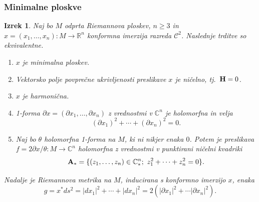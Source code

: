 \documentclass[9pt, table]{beamer}
\newtheorem{izrek}{Izrek}
\newcommand{\R}{\mathbb R}
\newcommand{\C}{\mathbb C}
\begin{document}
\begin{frame}
\frametitle{Minimalne ploskve}

\begin{izrek}
Naj bo $M$ odprta Riemannova ploskev, $n \geq 3$ in $x = (x_1, \dots , x_n) \colon M \to \R^{n}$ konformna imerzija razreda $\mathcal{C}^2$. Naslednje trditve so ekvivalentne.
\begin{enumerate}
	\item $x$ je minimalna ploskev.
	\item Vektorsko polje povprečne ukrivljenosti preslikave $x$ je ničelno, tj.~$\textbf{\textup{H}} = 0$.
	\item $x$ je harmonična.
	\item 1-forma $ \partial{x} = (\partial{x_1}, \dots , \partial{x_n})$ z vrednostmi v $\C^{n}$ je holomorfna in velja
			\begin{equation} \label{eq:partialx^2 = 0}
			(\partial{x_1})^2 + \cdots + (\partial{x_n})^2 = 0.
			\end{equation}
	\item Naj bo $\theta$ holomorfna 1-forma na $M$, ki ni nikjer enaka $0$. Potem je preslikava $f = 2\partial{x} / \theta \colon M \to \C^{n}$ holomorfna z 				vrednostmi v punktirani ničelni kvadriki
			\begin{equation}	
			\textbf{\textup{A}}_{*} = \{ (z_1, \dots , z_n) \in \C^{n}_{*} ; \ z_{1}^{2} + \cdots + z_{n}^{2} = 0 \}.
			\end{equation}	
\end{enumerate}
Nadalje je Riemannova metrika na $M$, inducirana s konformno imerzijo $x$, enaka
	\begin{equation} \label{eq:|dx|^2=2|partialx|^2}
	g = x^{*} ds^2 = |dx_1|^2 + \cdots + |dx_n|^2 = 2 (|\partial{x_1}|^2 + \cdots |\partial{x_n}|^2).
	\end{equation}			
\end{izrek}

\end{frame}

\end{document}

